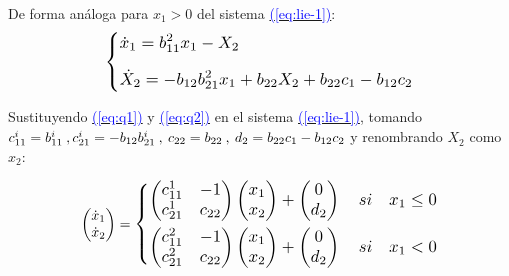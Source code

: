 \documentclass[12pt,a4paper]{report} %
\newcommand{\eref}[1]{\hyperref[#1]{\textcolor{blue}{(\ref*{#1})}}}
\newcommand{\eref}[1]{\hyperref[#1]{\textcolor{blue}{\textit{(\ref*{#1})}}}}
\begin{document}
	
	\vspace{0.5cm}\noindent De forma análoga para $x_1>0$ del sistema \eref{eq:lie-1}:
	\begin{equation}
		\label{eq:q2}
		\scalebox{1.2}{$\displaystyle
			\left\{
			\begin{aligned}
			&\dot{x}_1=b_{11}^2x_1-X_2 \\[2mm]
			&\dot{X}_2=-b_{12}b_{21}^2x_1+b_{22}X_2+b_{22}c_1-b_{12}c_2
		\end{aligned}
		\right.
		$}
	\end{equation}\smallskip
	
	\vspace{0.5cm}\noindent Sustituyendo \eref{eq:q1} y \eref{eq:q2} en el sistema \eref{eq:lie-1}, tomando $c_{11}^i=b_{11}^i \: , \: \\c_{21}^i=-b_{12}b_{21}^i \: , \: c_{22}=b_{22} \: , \: d_2=b_{22}c_1-b_{12}c_2$ y renombrando $X_2$ como $x_2$:
	
	\begin{equation}
		\begin{pmatrix*}[r]
			\dot{x}_1 \\ \dot{x}_2
		\end{pmatrix*}=
		\label{eq:lie-12}
		\scalebox{1.2}{$\displaystyle
			\left\{
			\begin{aligned}
				\begin{pmatrix*}[r]
					c_{11}^1 & -1 \\
					c_{21}^1 & c_{22}
				\end{pmatrix*}\begin{pmatrix*}[r]
				x_1\\x_2
				\end{pmatrix*}+\begin{pmatrix*}[c]
				0 \\ d_2
				\end{pmatrix*} \quad si \quad x_1 \leq 0 \\
				\begin{pmatrix*}[r]
					c_{11}^2 & -1 \\
					c_{21}^2 & c_{22}
				\end{pmatrix*}\begin{pmatrix*}[r]
				x_1\\x_2
				\end{pmatrix*}+\begin{pmatrix*}[c]
				0 \\ d_2
				\end{pmatrix*} \quad si \quad x_1 < 0
			\end{aligned}
			\right.
			$} 
	\end{equation}\smallskip
	
\end{document}
